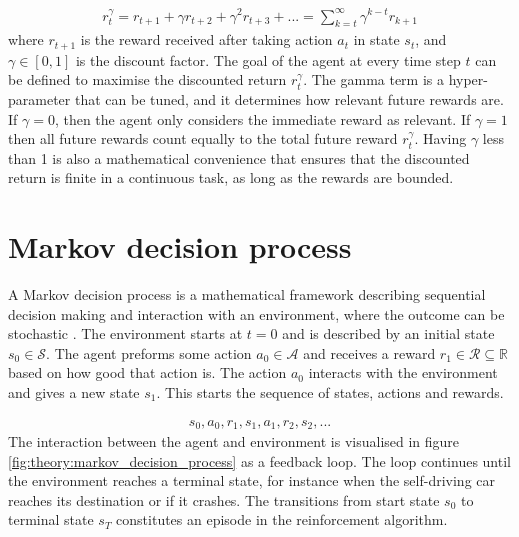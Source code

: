 \documentclass[class=book, crop=false]{standalone}
\begin{document}
\begin{equation}
   \begin{aligned}\label{eq:theory:discounted_reward}
r^{\gamma}_{t} = r_{t+1} + \gamma r_{t+2} + \gamma^{2} r_{t+3} + ...
= \sum_{k=t}^{\infty} \gamma^{k-t}r_{k+1}
\end{aligned} 
\end{equation}
where $r_{t+1}$ is the reward received after taking action $a_{t}$ in state $s_{t}$, and $\gamma \in [0,1]$ is the discount factor. The goal of the agent at every time step $t$ can be defined to maximise the discounted return $r^{\gamma}_{t}$. The gamma term is a hyper-parameter that can be tuned, and it determines how relevant future rewards are. If $\gamma = 0$, then the agent only considers the immediate reward as relevant. If $\gamma = 1$ then all future rewards count equally to the total future reward $r^{\gamma}_{t}$. Having $\gamma$ less than 1 is also a mathematical convenience that ensures that the discounted return is finite in a continuous task, as long as the rewards are bounded. 

\section{Markov decision process}\label{section:markov_decision_process}

A Markov decision process is a mathematical framework describing sequential decision making and interaction with an environment, where the outcome can be stochastic \cite{Sutton1998}. The environment starts at $t=0$ and is described by an initial state $s_{0} \in \mathcal{S}$. The agent preforms some action $a_{0}\in \mathcal{A}$ and receives a reward $r_{1}\in \mathcal{R} \subseteq \mathbb{R} $ based on how good that action is. The action $a_{0}$ interacts with the environment and gives a new state $s_{1}$. This starts the sequence of states, actions and rewards.


\begin{equation}
   \begin{aligned}\label{eq:theory:trajectory}
s_{0},a_{0},r_{1},s_{1}, a_{1},r_{2},s_{2},...
\end{aligned} 
\end{equation}
The interaction between the agent and environment is visualised in figure \ref{fig:theory:markov_decision_process} as a feedback loop. The loop continues until the environment reaches a terminal state, for instance when the self-driving car reaches its destination or if it crashes. The transitions from start state $s_{0}$ to terminal state $s_{T}$ constitutes an episode in the reinforcement algorithm.  
\end{document}

